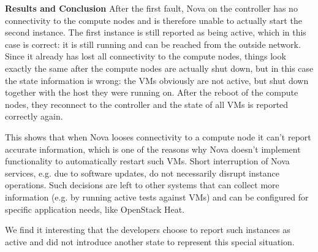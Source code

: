 \documentclass[conference]{IEEEtran}
\begin{document}
\textbf{Results and Conclusion}
After the first fault,  Nova on the controller has no connectivity to the compute nodes and is therefore unable to actually start the second instance. The first instance is still reported as being active, which in this case is correct: it is still running and can be reached from the outside network. Since it already has lost all connectivity to the compute nodes, things look exactly the same after the compute nodes are actually shut down, but in this case the state information is wrong: the VMs obviously are not active, but shut down together with the host they were running on. After the reboot of the compute nodes, they reconnect to the controller and the state of all VMs is reported correctly again.

This shows that when Nova looses connectivity to a compute node it can't report accurate information, which is one of the reasons why Nova doesn't implement functionality to automatically restart such VMs.  Short interruption of Nova services, e.g. due to software updates, do not necessarily disrupt instance operations. Such decisions are left to other systems that can collect more information (e.g. by running active tests against VMs) and can be configured for specific application needs, like OpenStack Heat. 

We find it interesting that the developers choose to report such instances as active and did not introduce another state to represent this special situation.
\end{document}
